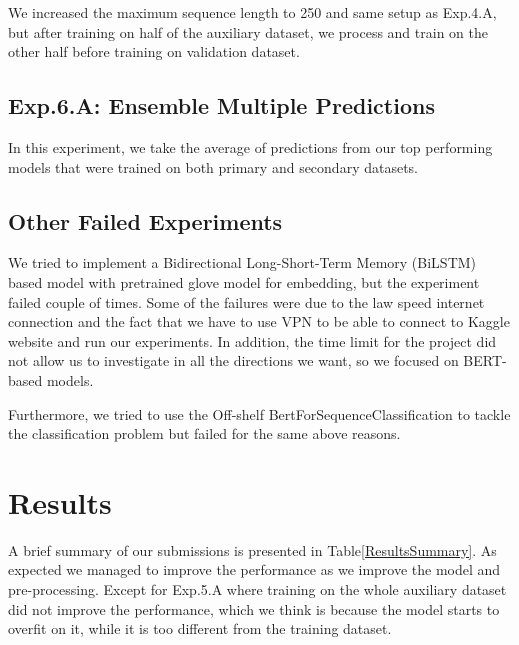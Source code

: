 \documentclass[10pt,twocolumn,letterpaper]{article}
\begin{document}
We increased the maximum sequence length to 250 and same setup as Exp.4.A, but after training on half of the auxiliary dataset, we process and train on the other half before training on validation dataset.

\subsection{Exp.6.A: Ensemble Multiple Predictions}

In this experiment, we take the average of predictions from our top performing models that were trained on both primary and secondary datasets. 

\subsection{Other Failed Experiments}
We tried to implement a Bidirectional Long-Short-Term Memory (BiLSTM) based model with pretrained glove model for embedding, but the experiment failed couple of times. Some of the failures were due to the law speed internet  connection and the fact that we have to use VPN to be able to connect to Kaggle website and run our experiments. In addition, the time limit for the project did not allow us to investigate in all the directions we want, so we focused on BERT-based models.

Furthermore, we tried to use the Off-shelf BertForSequenceClassification to tackle the classification problem but failed for the same above reasons.   

 
\section{Results}
A brief summary of our submissions is presented in Table\ref{ResultsSummary}. As expected we managed to improve the performance as we improve the model and pre-processing. Except for Exp.5.A where training on the whole auxiliary dataset did not  improve the performance, which we think is because the model starts to overfit on it, while it is too different from the training dataset. 
\end{document}
